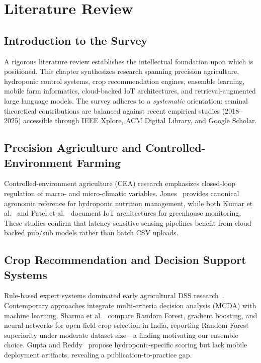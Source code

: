 \chapter{Literature Review}
\label{ch:literature}

\section{Introduction to the Survey}
\label{sec:lit_intro}

A rigorous literature review establishes the intellectual foundation upon which \HydroSmart{} is positioned. This chapter synthesizes research spanning precision agriculture, hydroponic control systems, crop recommendation engines, ensemble learning, mobile farm informatics, cloud-backed IoT architectures, and retrieval-augmented large language models. The survey adheres to a \emph{systematic} orientation: seminal theoretical contributions are balanced against recent empirical studies (2018--2025) accessible through IEEE Xplore, ACM Digital Library, and Google Scholar.

\section{Precision Agriculture and Controlled-Environment Farming}
\label{sec:lit_cea}

Controlled-environment agriculture (CEA) research emphasizes closed-loop regulation of macro- and micro-climatic variables. Jones~\cite{jones2016hydroponic} provides canonical agronomic reference for hydroponic nutrition management, while both Kumar et al.~\cite{kumar2020iot_agri} and Patel et al.~\cite{patel2021smart_farming} document IoT architectures for greenhouse monitoring. These studies confirm that latency-sensitive sensing pipelines benefit from cloud-backed pub/sub models rather than batch CSV uploads.

\section{Crop Recommendation and Decision Support Systems}
\label{sec:lit_dss}

Rule-based expert systems dominated early agricultural DSS research~\cite{plant1989expert}. Contemporary approaches integrate multi-criteria decision analysis (MCDA) with machine learning. Sharma et al.~\cite{sharma2022crop_ml} compare Random Forest, gradient boosting, and neural networks for open-field crop selection in India, reporting Random Forest superiority under moderate dataset size---a finding motivating our ensemble choice. Gupta and Reddy~\cite{gupta2023hydro_dss} propose hydroponic-specific scoring but lack mobile deployment artifacts, revealing a publication-to-practice gap.

